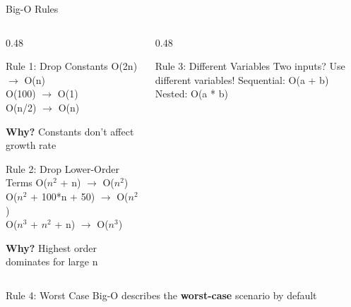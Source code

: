 \documentclass[aspectratio=169,xcolor=dvipsnames]{beamer}
\begin{document}
\begin{frame}{Big-O Rules}
  \begin{columns}
    \begin{column}{0.48\textwidth}
      \begin{block}{Rule 1: Drop Constants}
        O(2n) $\rightarrow$ O(n) \\
        O(100) $\rightarrow$ O(1) \\
        O(n/2) $\rightarrow$ O(n)

        \vspace{0.2cm}

        \textbf{Why?} Constants don't affect growth rate
      \end{block}

      \vspace{0.3cm}

      \begin{block}{Rule 2: Drop Lower-Order Terms}
        O($n^2$ + n) $\rightarrow$ O($n^2$) \\
        O($n^2$ + 100*n + 50) $\rightarrow$ O($n^2$) \\
        O($n^3$ + $n^2$ + n) $\rightarrow$ O($n^3$)

        \vspace{0.2cm}

        \textbf{Why?} Highest order dominates for large n
      \end{block}
    \end{column}
    \begin{column}{0.48\textwidth}
      \begin{block}{Rule 3: Different Variables}
        Two inputs? Use different variables!
        \vspace{0.2cm}
        Sequential: O(a + b) \\
        Nested: O(a * b)
      \end{block}
    \end{column}
  \end{columns}

  \vspace{0.3cm}

  \begin{alertblock}{Rule 4: Worst Case}
    Big-O describes the \textbf{worst-case} scenario by default
  \end{alertblock}
\end{frame}
\end{document}
